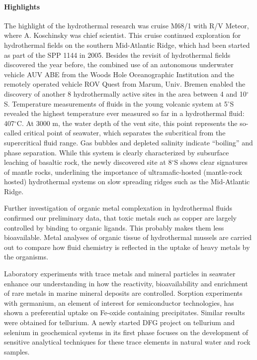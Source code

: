 \paragraph{Highlights}
The highlight of the hydrothermal research was cruise M68/1 with R/V
Meteor, where A. Koschinsky was chief scientist. This cruise continued
exploration for hydrothermal fields on the southern Mid-Atlantic
Ridge, which had been started as part of the SPP 1144 in 2005. Besides
the revisit of hydrothermal fields discovered the year before, the
combined use of an autonomous underwater vehicle AUV ABE from the
Woods Hole Oceanographic Institution and the remotely operated vehicle
ROV Quest from Marum, Univ. Bremen enabled the discovery of another 8
hydrothermally active sites in the area between 4 and
10$^\circ$S. Temperature measurements of fluids in the young volcanic
system at 5$^\circ$S revealed the highest temperature ever measured so
far in a hydrothermal fluid: 407$^\circ$C. At 3000 m, the water depth
of the vent site, this point represents the so-called critical point
of seawater, which separates the subcritical from the supercritical
fluid range. Gas bubbles and depleted salinity indicate ``boiling''
and phase separation. While this system is clearly characterized by
subsurface leaching of basaltic rock, the newly discovered site at
8$^\circ$S shows clear signatures of mantle rocks, underlining the
importance of ultramafic-hosted (mantle-rock hosted) hydrothermal
systems on slow spreading ridges such as the Mid-Atlantic Ridge.

Further investigation of organic metal complexation in hydrothermal
fluids confirmed our preliminary data, that toxic metals such as
copper are largely controlled by binding to organic ligands. This
probably makes them less bioavailable. Metal analyses of organic
tissue of hydrothermal mussels are carried out to compare how fluid
chemistry is reflected in the uptake of heavy metals by the organisms.

Laboratory experiments with trace metals and mineral particles in
seawater enhance our understanding in how the reactivity,
bioavailability and enrichment of rare metals in marine mineral deposits
are controlled. Sorption experiments with germanium, an element of
interest for semiconductor technologies, has shown a preferential
uptake on Fe-oxide containing precipitates. Similar results were
obtained for tellurium.  A newly started DFG project on tellurium and
selenium in geochemical systems in its first phase focuses on the
development of sensitive analytical techniques for these trace
elements in natural water and rock samples.

